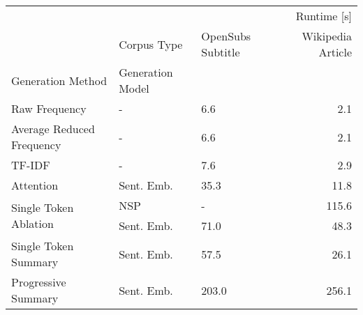 \begin{tabular}{lllr}
\toprule
 &  & \multicolumn{2}{r}{Runtime [s]} \\
 & Corpus Type & OpenSubs Subtitle & Wikipedia Article \\
Generation Method & Generation Model &  &  \\
\midrule
Raw Frequency & - & 6.6 & 2.1 \\
\cline{1-4}
Average Reduced Frequency & - & 6.6 & 2.1 \\
\cline{1-4}
TF-IDF & - & 7.6 & 2.9 \\
\cline{1-4}
Attention & Sent. Emb. & 35.3 & 11.8 \\
\cline{1-4}
\multirow[t]{2}{*}{Single Token Ablation} & NSP & - & 115.6 \\
 & Sent. Emb. & 71.0 & 48.3 \\
\cline{1-4}
Single Token Summary & Sent. Emb. & 57.5 & 26.1 \\
\cline{1-4}
Progressive Summary & Sent. Emb. & 203.0 & 256.1 \\
\cline{1-4}
\bottomrule
\end{tabular}
